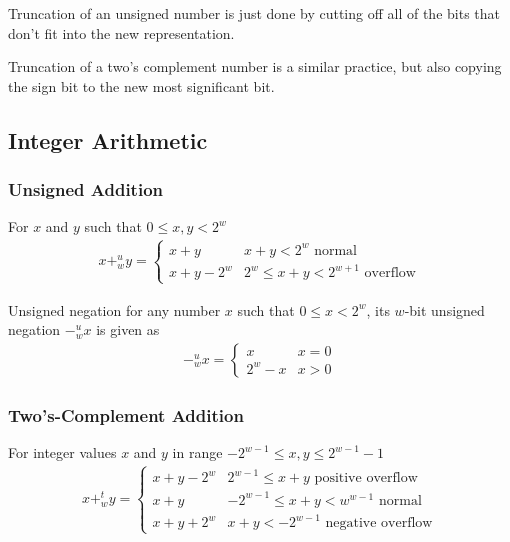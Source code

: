 \documentclass[10pt]{armath}
\begin{document}
Truncation of an unsigned number is just done by cutting off all of the bits
that don't fit into the new representation.

Truncation of a two's complement number is a similar practice, but also
copying the sign bit to the new most significant bit.

\subsection{Integer Arithmetic}%
\label{sub:integer_arithmetic}

\subsubsection{Unsigned Addition}%
\label{ssub:unsigned_addition}

For $x$ and $y$ such that $0\leq x,y <2^w$
\begin{align*}
  x+_w^uy=\begin{cases}
    x+y & x+y < 2^w  \text{  normal}\\
    x + y - 2^w & 2^w \leq x+y < 2^{w+1}  \text{  overflow}
  \end{cases}
\end{align*}

Unsigned negation
for any number $x$ such that $0\leq x<2^w$, its $w$-bit unsigned negation
$-_w^ux$ is given as
\begin{align*}
  -_w^ux=\begin{cases}
    x & x=0\\
    2^w-x & x>0
  \end{cases}
\end{align*}

\subsubsection{Two's-Complement Addition}%
\label{ssub:two_s_complement_addition}

For integer values $x$ and $y$ in range $-2^{w-1}\leq x,y \leq 2^{w-1}-1$
\begin{align*}
  x+_w^ty=\begin{cases}
    x+y-2^w & 2^{w-1}\leq x+y\text{  positive overflow}\\
    x+y & -2^{w-1}\leq x+y < w^{w-1}\text{  normal}\\
    x+y+2^w & x+y < -2^{w-1}\text{  negative overflow}
  \end{cases}
\end{align*}
\end{document}
